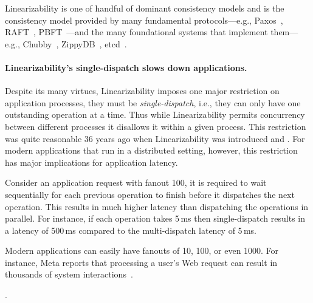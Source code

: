 Linearizability is one of handful of dominant consistency models and is the consistency model provided by many fundamental protocols---e.g., Paxos~\cite{lamport1998paxos}, RAFT~\cite{ongaro2014raft}, PBFT~\cite{castro1999pbft}---and the many foundational systems that implement them---e.g., Chubby~\cite{chubby}, ZippyDB~\cite{zippydb}, etcd~\cite{etcd}.

\paragraph{Linearizability's single-dispatch slows down applications.}
Despite its many virtues, Linearizability imposes one major restriction on application processes, they must be \textit{single-dispatch}, i.e., they can only have one outstanding operation at a time. Thus while Linearizability permits concurrency between different processes it disallows it within a given process. This restriction was quite reasonable 36 years ago when Linearizability was introduced and . For modern applications that run in a distributed setting, however, this restriction has major implications for application latency.


Consider an application request with fanout 100, it is required to wait sequentially for each previous operation to finish before it dispatches the next operation. This results in much higher latency than dispatching the operations in parallel. For instance, if each operation takes 5\,ms then single-dispatch results in a latency of 500\,ms compared to the multi-dispatch latency of 5\,ms.

Modern applications can easily have fanouts of 10, 100, or even 1000. For instance, Meta reports that processing a user's Web request can result in thousands of system interactions~\cite{ajoux2015challenges}.

.

